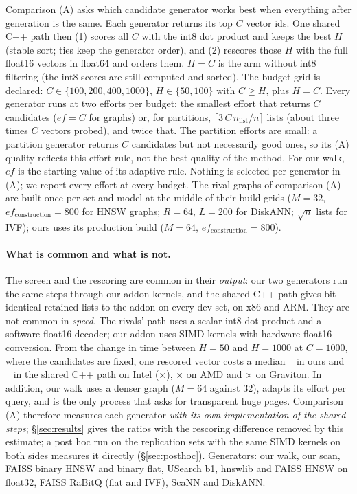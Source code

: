 Comparison (A) asks which candidate generator works best when everything after generation is the
same. Each generator returns its top $C$ vector ids. One shared C++ path then (1) scores all $C$
with the int8 dot product and keeps the best $H$ (stable sort; ties keep the generator order), and
(2) rescores those $H$ with the full float16 vectors in float64 and orders them. $H = C$ is the arm
without int8 filtering (the int8 scores are still computed and sorted). The budget grid is declared: $C \in \{100, 200, 400, 1000\}$,
$H \in \{50, 100\}$ with $C \ge H$, plus $H = C$. Every generator runs at two efforts per budget: the
smallest effort that returns $C$ candidates ($ef = C$ for graphs) or, for partitions,
$\lceil 3\,C\,n_{\text{list}}/n\rceil$ lists (about three times $C$ vectors probed), and twice that. The
partition efforts are small: a partition generator returns $C$ candidates but not necessarily good
ones, so its (A) quality reflects this effort rule, not the best quality of the method. For our walk, $ef$ is the starting value of its adaptive rule. Nothing is selected per generator
in (A); we report every effort at every budget. The rival graphs of comparison (A) are built once per
set and model at the middle of their build grids ($M = 32$, $ef_{\text{construction}} = 800$ for HNSW
graphs; $R = 64$, $L = 200$ for DiskANN; $\sqrt n$ lists for IVF); ours uses its production build
($M = 64$, $ef_{\text{construction}} = 800$).

\paragraph{What is common and what is not.} The screen and the rescoring are common in their
\emph{output}: our two generators run the same steps through our addon kernels, and the shared C++ path
gives bit-identical retained lists to the addon on every dev set, on x86 and ARM. They are not common in
\emph{speed}. The rivals' path uses a scalar int8 dot product and a software float16 decoder; our addon
uses SIMD kernels with hardware float16 conversion. From the change in time between $H = 50$ and
$H = 1000$ at $C = 1000$, where the candidates are fixed, one rescored vector costs a median
~\us{} in ours and ~\us{} in the shared C++ path on Intel
($\times$), $\times$ on AMD and $\times$ on Graviton. In
addition, our walk uses a denser graph ($M = 64$ against 32), adapts its effort per query, and is the only
process that asks for transparent huge pages. Comparison (A) therefore measures each generator
\emph{with its own implementation of the shared steps}; \S\ref{sec:results} gives the ratios with the
rescoring difference removed by this estimate; a post hoc run on the replication sets with the same SIMD kernels on both
sides measures it directly (\S\ref{sec:posthoc}). Generators: our walk, our
scan, FAISS binary HNSW and binary flat, USearch b1, hnswlib and FAISS HNSW on float32, FAISS RaBitQ
(flat and IVF), ScaNN and DiskANN.

